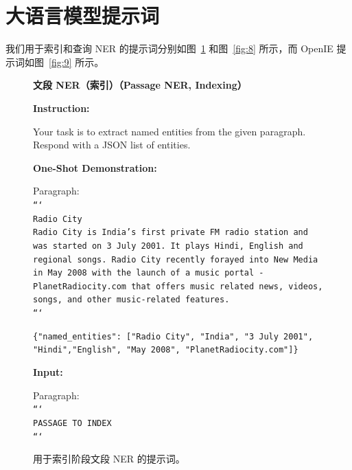 \documentclass[11pt,UTF8,fontset=fandol]{ctexart}
\begin{document}
\section{大语言模型提示词}

我们用于索引和查询 NER 的提示词分别如图~\ref{fig:7} 和图~\ref{fig:8} 所示，而 OpenIE 提示词如图~\ref{fig:9} 所示。

\begin{figure}[H]\centering
\begin{tcolorbox}[colback=white,colframe=black!55,boxrule=0.5pt,left=4pt,right=4pt,top=3pt,bottom=3pt,width=\linewidth]
\begin{center}\textbf{文段 NER（索引）（Passage NER, Indexing）}\end{center}
\small
\textbf{Instruction:}

Your task is to extract named entities from the given paragraph. Respond with a JSON list of entities.

\textbf{One-Shot Demonstration:}

Paragraph:\\
\texttt{```}\\
\texttt{Radio City}\\
\texttt{Radio City is India's first private FM radio station and was started on 3 July 2001. It plays Hindi, English and regional songs. Radio City recently forayed into New Media in May 2008 with the launch of a music portal - PlanetRadiocity.com that offers music related news, videos, songs, and other music-related features.}\\
\texttt{```}

\texttt{\{"named\_entities": ["Radio City", "India", "3 July 2001", "Hindi","English", "May 2008", "PlanetRadiocity.com"]\}}

\textbf{Input:}

Paragraph:\\
\texttt{```}\\
\texttt{PASSAGE TO INDEX}\\
\texttt{```}
\end{tcolorbox}
\caption{用于索引阶段文段 NER 的提示词。}
\label{fig:7}
\end{figure}
\end{document}
